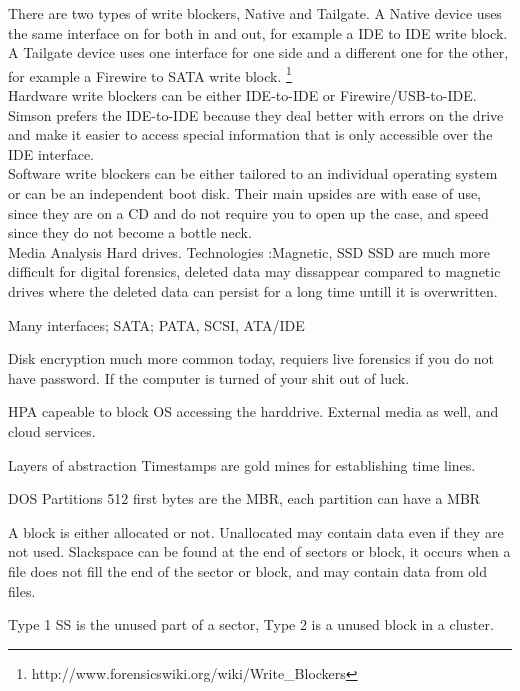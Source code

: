 There are two types of write blockers, Native and Tailgate. A Native device uses 
the same interface on for both in and out, for example a IDE to IDE write block. 
A Tailgate device uses one interface for one side and a different one for the 
other, for example a Firewire to SATA write block.
\footnote{http://www.forensicswiki.org/wiki/Write\_Blockers}\\

Hardware write blockers can be either IDE-to-IDE or Firewire/USB-to-IDE. 
Simson prefers the IDE-to-IDE because they deal better with errors on the drive 
and make it easier to access special information that is only accessible over 
the IDE interface.\\

Software write blockers can be either tailored to an individual operating system
or can be an independent boot disk. Their main upsides are with ease of use, 
since they are on a CD and do not require you to open up the case, and speed 
since they do not become a bottle neck.\\




    Media Analysis
    Hard drives.
    Technologies :Magnetic, SSD
    SSD are much more difficult for digital forensics, deleted data may dissappear compared
    to magnetic drives where the deleted data can persist for a long time
    untill it is overwritten.

    Many interfaces; SATA; PATA, SCSI, ATA/IDE

    Disk encryption much more common today, requiers live forensics if
    you do not have password. If the computer is turned of your shit out of
    luck.
    
    HPA capeable to block OS accessing the harddrive.
    External media as well, and cloud services.


    Layers of abstraction
    Timestamps are gold mines for establishing time lines.

    DOS Partitions
    512 first bytes are the MBR, each partition can have a MBR

    A block is either allocated or not. Unallocated may contain data
    even if they are not used.
    Slackspace can be found at the end of sectors or block, it occurs
    when a file does not fill the end of the sector or block, and may
    contain data from old files.

    Type 1 SS is the unused part of a sector, Type 2 is a unused block
    in a cluster.

